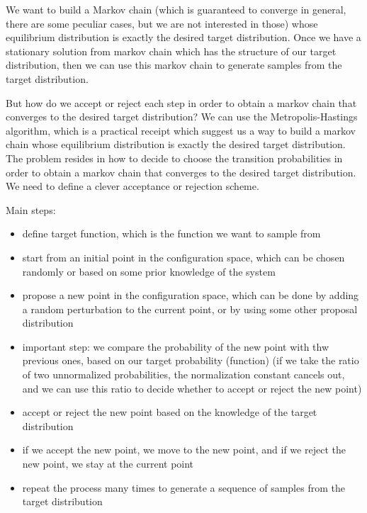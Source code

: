 We want to build a Markov chain (which is guaranteed to converge in general, there are some peculiar cases, but we are not interested in those) whose equilibrium distribution is exactly the desired target distribution. Once we have a stationary solution from markov chain which has the structure of our target distribution, then we can use this markov chain to generate samples from the target distribution.

But how do we accept or reject each step in order to obtain a markov chain that converges to the desired target distribution? We can use the Metropolis-Hastings algorithm, which is a practical receipt which suggest us a way to build a markov chain whose equilibrium distribution is exactly the desired target distribution. The problem resides in how to decide to choose the transition probabilities in order to obtain a markov chain that converges to the desired target distribution. We need to define a clever acceptance or rejection scheme.

Main steps:
\begin{itemize}
    \item define target function, which is the function we want to sample from
    \item start from an initial point in the configuration space, which can be chosen randomly or based on some prior knowledge of the system
    \item propose a new point in the configuration space, which can be done by adding a random perturbation to the current point, or by using some other proposal distribution
    \item important step: we compare the probability of the new point with thw previous ones, based on our target probability (function) (if we take the ratio of two unnormalized probabilities, the normalization constant cancels out, and we can use this ratio to decide whether to accept or reject the new point)
    \item accept or reject the new point based on the knowledge of the target distribution
    \item if we accept the new point, we move to the new point, and if we reject the new point, we stay at the current point
    \item repeat the process many times to generate a sequence of samples from the target distribution
\end{itemize}

